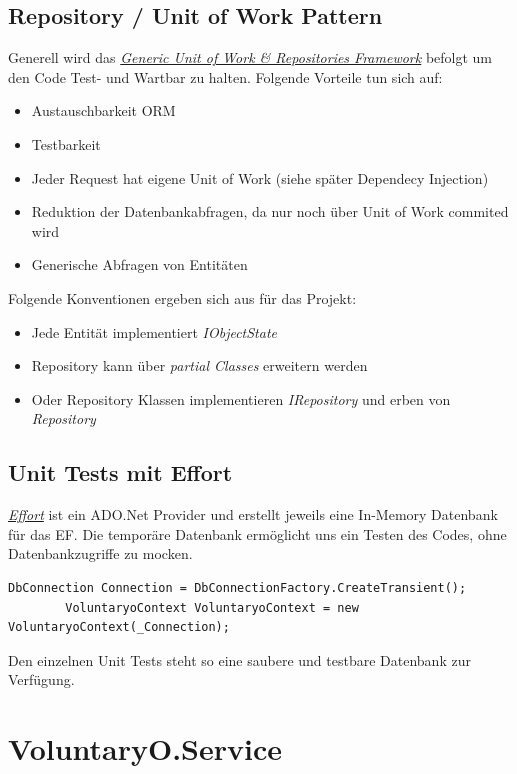 	\subsection{Repository / Unit of Work Pattern}
	Generell wird das \href{https://genericunitofworkandrepositories.codeplex.com/}{\textit{Generic Unit of Work \& Repositories Framework}} befolgt um den Code Test- und Wartbar zu halten. Folgende Vorteile tun sich auf:
	\\\begin{itemize}	
		\item Austauschbarkeit ORM
		\item Testbarkeit
		\item Jeder Request hat eigene Unit of Work (siehe später Dependecy Injection)
		\item Reduktion der Datenbankabfragen, da nur noch über Unit of Work commited wird
		\item Generische Abfragen von Entitäten
	\end{itemize}
	Folgende Konventionen ergeben sich aus für das Projekt:
	\\\begin{itemize}
		\item Jede Entität implementiert \textit{IObjectState}
		\item Repository kann über \textit{partial Classes} erweitern werden
		\item Oder Repository Klassen implementieren \textit{IRepository} und erben von \textit{Repository}
	\end{itemize}

	\subsection{Unit Tests mit Effort}
	\href{https://effort.codeplex.com/}{\textit{Effort}} ist ein ADO.Net Provider und erstellt jeweils eine In-Memory Datenbank für das EF. Die temporäre Datenbank ermöglicht uns ein Testen des Codes, ohne Datenbankzugriffe zu mocken.
	\begin{lstlisting}[language=CSharp, caption=Verwendung Effort für Unit Tests in EffortTest.cs, label=lst:effortunittest, firstnumber=1]
		DbConnection Connection = DbConnectionFactory.CreateTransient();
		VoluntaryoContext VoluntaryoContext = new VoluntaryoContext(_Connection);
    \end{lstlisting}
    Den einzelnen Unit Tests steht so eine saubere und testbare Datenbank zur Verfügung.


\section{VoluntaryO.Service}



